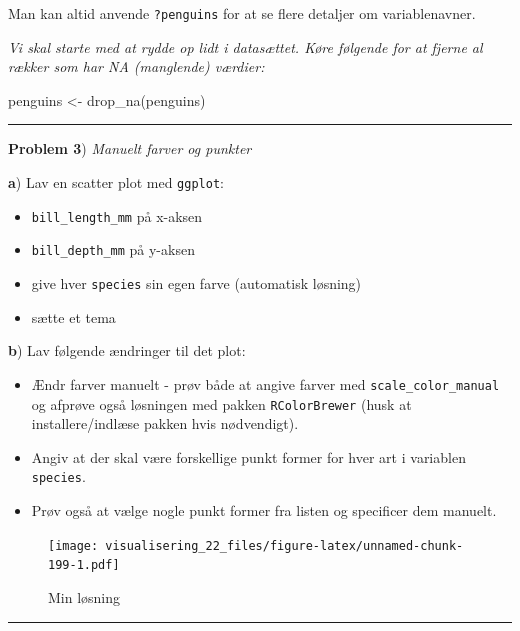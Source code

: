 \documentclass[
]{book}
\newenvironment{Shaded}{\begin{snugshade}}{\end{snugshade}}
\newcommand{\FunctionTok}[1]{\textcolor[rgb]{0.00,0.00,0.00}{#1}}
\newcommand{\NormalTok}[1]{#1}
\newcommand{\OtherTok}[1]{\textcolor[rgb]{0.56,0.35,0.01}{#1}}
\providecommand{\tightlist}{%
  \setlength{\itemsep}{0pt}\setlength{\parskip}{0pt}}
\begin{document}
Man kan altid anvende \texttt{?penguins} for at se flere detaljer om variablenavner.

\emph{Vi skal starte med at rydde op lidt i datasættet. Køre følgende for at fjerne al rækker som har NA (manglende) værdier:}

\begin{Shaded}
\begin{Highlighting}[]
\NormalTok{penguins }\OtherTok{\textless{}{-}} \FunctionTok{drop\_na}\NormalTok{(penguins)}
\end{Highlighting}
\end{Shaded}

\begin{center}\rule{0.5\linewidth}{0.5pt}\end{center}

\textbf{Problem 3}) \emph{Manuelt farver og punkter}

\textbf{a}) Lav en scatter plot med \texttt{ggplot}:

\begin{itemize}
\tightlist
\item
  \texttt{bill\_length\_mm} på x-aksen
\item
  \texttt{bill\_depth\_mm} på y-aksen
\item
  give hver \texttt{species} sin egen farve (automatisk løsning)
\item
  sætte et tema
\end{itemize}

\textbf{b}) Lav følgende ændringer til det plot:

\begin{itemize}
\tightlist
\item
  Ændr farver manuelt - prøv både at angive farver med \texttt{scale\_color\_manual} og afprøve også løsningen med pakken \texttt{RColorBrewer} (husk at installere/indlæse pakken hvis nødvendigt).
\item
  Angiv at der skal være forskellige punkt former for hver art i variablen \texttt{species}.
\item
  Prøv også at vælge nogle punkt former fra listen og specificer dem manuelt.
\end{itemize}

\begin{figure}
\centering
\texttt{[image: visualisering\_22\_files/figure-latex/unnamed-chunk-199-1.pdf]}
\caption{\label{fig:unnamed-chunk-199}Min løsning}
\end{figure}

\begin{center}\rule{0.5\linewidth}{0.5pt}\end{center}
\end{document}
